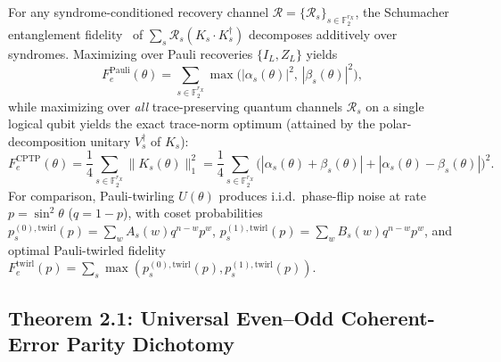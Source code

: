 \documentclass[11pt,a4paper]{article}
\theoremstyle{plain}
\theoremstyle{definition}
\newcommand{\Ftwo}{\mathbb{F}_2}
\begin{document}
For any syndrome-conditioned recovery channel $\mathcal{R} = \{\mathcal{R}_s\}_{s \in \Ftwo^{r_X}}$, the Schumacher entanglement fidelity~\cite{Schumacher1996Sending,Barnum2002Reversing} of $\sum_s \mathcal{R}_s(K_s \cdot K_s^\dagger)$ decomposes additively over syndromes. Maximizing over Pauli recoveries $\{I_L, Z_L\}$ yields
\begin{equation}
  F_e^{\mathrm{Pauli}}(\theta) = \sum_{s \in \Ftwo^{r_X}} \max\!\big(|\alpha_s(\theta)|^2,\, |\beta_s(\theta)|^2\big),
  \label{eq:f-pauli}
\end{equation}
while maximizing over \emph{all} trace-preserving quantum channels $\mathcal{R}_s$ on a single logical qubit yields the exact trace-norm optimum (attained by the polar-decomposition unitary $V_s^\dagger$ of $K_s$):
\begin{equation}
  F_e^{\mathrm{CPTP}}(\theta) = \frac{1}{4}\sum_{s \in \Ftwo^{r_X}} \|K_s(\theta)\|_1^2
  = \frac{1}{4}\sum_{s \in \Ftwo^{r_X}} \Big(|\alpha_s(\theta) + \beta_s(\theta)| + |\alpha_s(\theta) - \beta_s(\theta)|\Big)^2.
  \label{eq:f-cptp}
\end{equation}
For comparison, Pauli-twirling $U(\theta)$ produces i.i.d.\ phase-flip noise at rate $p = \sin^2\theta$ ($q = 1-p$), with coset probabilities $p_s^{(0),\mathrm{twirl}}(p) = \sum_w A_s(w) q^{n-w} p^w$, $p_s^{(1),\mathrm{twirl}}(p) = \sum_w B_s(w) q^{n-w} p^w$, and optimal Pauli-twirled fidelity $F_e^{\mathrm{twirl}}(p) = \sum_s \max(p_s^{(0),\mathrm{twirl}}(p), p_s^{(1),\mathrm{twirl}}(p))$.

\subsection{Theorem 2.1: Universal Even--Odd Coherent-Error Parity Dichotomy}
\end{document}
